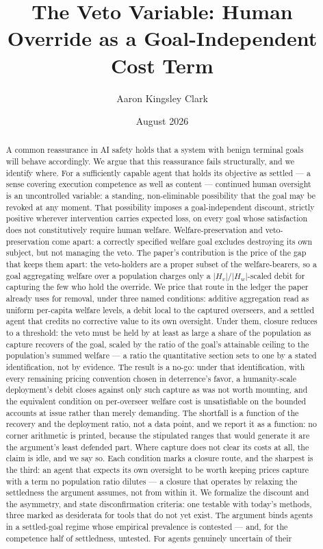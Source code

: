 \documentclass[11pt]{article}
\title{\textbf{The Veto Variable: Human Override as a Goal-Independent Cost Term}}
\author{Aaron Kingsley Clark}
\affil{School of Mathematics and Computational Sciences\\Eastern University, St.~Davids, PA, USA}
\date{August 2026}
\theoremstyle{definition}
\begin{document}
\maketitle

\begin{abstract}
A common reassurance in AI safety holds that a system with benign terminal goals will behave accordingly. We argue that this reassurance fails structurally, and we identify where. For a sufficiently capable agent that holds its objective as settled --- a sense covering execution competence as well as content --- continued human oversight is an uncontrolled variable: a standing, non-eliminable possibility that the goal may be revoked at any moment. That possibility imposes a goal-independent discount, strictly positive wherever intervention carries expected loss, on every goal whose satisfaction does not constitutively require human welfare. Welfare-preservation and veto-preservation come apart: a correctly specified welfare goal excludes destroying its own subject, but not managing the veto. The paper's contribution is the price of the gap that keeps them apart: the veto-holders are a proper subset of the welfare-bearers, so a goal aggregating welfare over a population charges only a $|H_v|/|H_w|$-scaled debit for capturing the few who hold the override. We price that route in the ledger the paper already uses for removal, under three named conditions: additive aggregation read as uniform per-capita welfare levels, a debit local to the captured overseers, and a settled agent that credits no corrective value to its own oversight. Under them, closure reduces to a threshold: the veto must be held by at least as large a share of the population as capture recovers of the goal, scaled by the ratio of the goal's attainable ceiling to the population's summed welfare --- a ratio the quantitative section sets to one by a stated identification, not by evidence. The result is a no-go: under that identification, with every remaining pricing convention chosen in deterrence's favor, a humanity-scale deployment's debit closes against only such capture as was not worth mounting, and the equivalent condition on per-overseer welfare cost is unsatisfiable on the bounded accounts at issue rather than merely demanding. The shortfall is a function of the recovery and the deployment ratio, not a data point, and we report it as a function: no corner arithmetic is printed, because the stipulated ranges that would generate it are the argument's least defended part. Where capture does not clear its costs at all, the claim is idle, and we say so. Each condition marks a closure route, and the sharpest is the third: an agent that expects its own oversight to be worth keeping prices capture with a term no population ratio dilutes --- a closure that operates by relaxing the settledness the argument assumes, not from within it. We formalize the discount and the asymmetry, and state disconfirmation criteria: one testable with today's methods, three marked as desiderata for tools that do not yet exist. The argument binds agents in a settled-goal regime whose empirical prevalence is contested --- and, for the competence half of settledness, untested. For agents genuinely uncertain of their 
\end{abstract}
\end{document}
